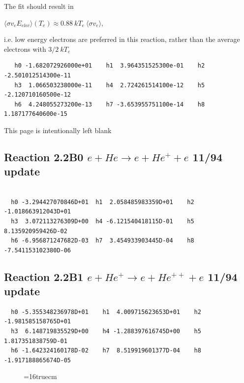 \documentclass[12pt,dvips]{article}
\begin{document}
The fit should result in

$\langle\sigma v_e E_{elec}\rangle(T_e) \approx 0.88 ~kT_e ~\langle\sigma v_e\rangle$,

i.e. low energy electrons are preferred in this reaction, rather than the average electrons with $3/2~kT_e$


\begin{small}\begin{verbatim}
   h0 -1.682072926000e+01    h1  3.964351525300e-01    h2 -2.501012514300e-11
   h3  1.066503238000e-11    h4  2.724261514100e-12    h5 -2.120710160500e-12
   h6  4.248055273200e-13    h7 -3.653955751100e-14    h8  1.187177640600e-15

\end{verbatim}\end{small}
\newpage
This page is intentionally left blank
\newpage


\subsection{
Reaction 2.2B0 $e + He \rightarrow e + He^+ + e $ 11/94 update
}

\begin{small}\begin{verbatim}

  h0 -3.294427070846D+01  h1  2.058485983359D+01    h2 -1.018663912043D+01
  h3  3.072113276309D+00  h4 -6.121540418115D-01    h5  8.135920959426D-02
  h6 -6.956871247682D-03  h7  3.454933903445D-04    h8 -7.541153102380D-06
\end{verbatim}\end{small}

\subsection{
Reaction 2.2B1 $e + He^+ \rightarrow e + He^{++} + e$ 11/94 update
}


\begin{small}\begin{verbatim}
  h0 -5.355348236978D+01    h1  4.009715623653D+01    h2 -1.981585158765D+01
  h3  6.148719835529D+00    h4 -1.288397616745D+00    h5  1.817351838759D-01
  h6 -1.642324160178D-02    h7  8.519919601377D-04    h8 -1.917188865674D-05
\end{verbatim}\end{small}

\begin{figure} \label{e2.2B}
\epsfxsize=16truecm
\end{figure}
\newpage
\end{document}
